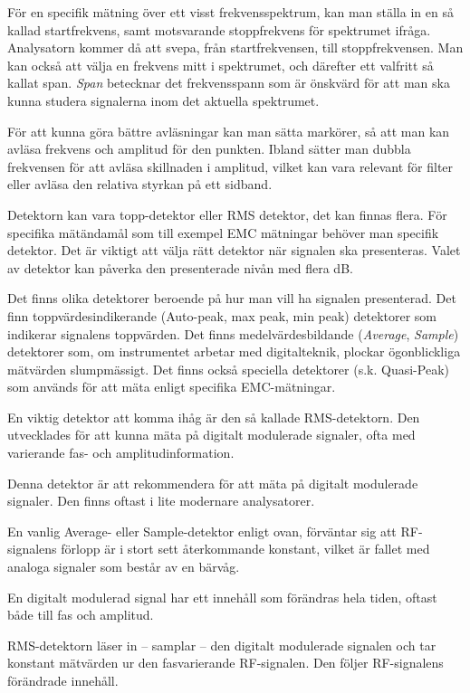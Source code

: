 För en specifik mätning över ett visst frekvensspektrum, kan man ställa in en
så kallad startfrekvens, samt motsvarande stoppfrekvens för spektrumet ifråga.
Analysatorn kommer då att svepa, från startfrekvensen, till stoppfrekvensen.
Man kan också att välja en frekvens mitt i spektrumet, och därefter ett
valfritt så kallat span.
\emph{Span} betecknar det frekvensspann som är önskvärd för att man ska
kunna studera signalerna inom det aktuella spektrumet.

För att kunna göra bättre avläsningar kan man sätta markörer, så att man kan
avläsa frekvens och amplitud för den punkten.
Ibland sätter man dubbla frekvensen för att avläsa skillnaden i amplitud,
vilket kan vara relevant för filter eller avläsa den relativa styrkan på ett
sidband.

Detektorn kan vara topp-detektor eller RMS detektor, det kan finnas flera.
För specifika mätändamål som till exempel EMC mätningar behöver man specifik detektor.
Det är viktigt att välja rätt detektor när signalen ska presenteras.
Valet av detektor kan påverka den presenterade nivån med flera dB.

Det finns olika detektorer beroende på hur man vill ha signalen presenterad.
Det finn toppvärdesindikerande (Auto-peak, max peak, min peak) detektorer som
indikerar signalens toppvärden.
Det finns medelvärdesbildande (\emph{Average}, \emph{Sample}) detektorer som, om
instrumentet arbetar med digitalteknik, plockar ögonblickliga mätvärden
slumpmässigt.
Det finns också speciella detektorer (s.k. Quasi-Peak) som används för att
mäta enligt specifika EMC-mätningar.

En viktig detektor att komma ihåg är den så kallade RMS-detektorn.
Den utvecklades för att kunna mäta på digitalt modulerade signaler, ofta med
varierande fas- och amplitudinformation.

Denna detektor är att rekommendera för att mäta på digitalt modulerade signaler.
Den finns oftast i lite modernare analysatorer.

En vanlig Average- eller Sample-detektor enligt ovan, förväntar sig att
RF-signalens förlopp är  i stort sett återkommande konstant, vilket är fallet
med analoga signaler som består av en bärvåg.

En digitalt modulerad signal har ett innehåll som förändras hela tiden, oftast
både till fas och amplitud.

RMS-detektorn läser in -- samplar -- den digitalt modulerade signalen och tar
konstant mätvärden ur den fasvarierande RF-signalen.
Den följer RF-signalens förändrade innehåll.

